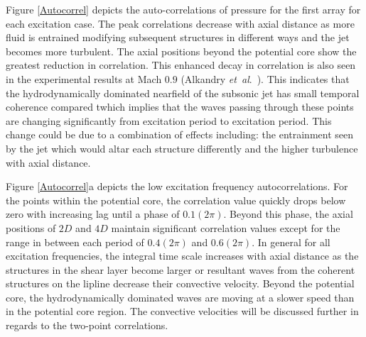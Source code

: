 \documentclass[english]{aiaa-tc}
\newcommand*{\etal}{\textit{et~al}.\ }
\begin{document}
Figure \ref{Autocorrel} depicts the auto-correlations of pressure for the first array for each excitation case. The peak correlations decrease with axial distance as more fluid is entrained modifying subsequent structures in different ways and the jet becomes more turbulent. The axial positions beyond the potential core show the greatest reduction in correlation. This enhanced decay in correlation is also seen in the experimental results at Mach $0.9$ (Alkandry \etal \cite{Alkandry2013}). This indicates that the hydrodynamically dominated nearfield of the subsonic jet has small temporal coherence compared twhich implies that the waves passing through these points are changing significantly from excitation period to excitation period. This change could be due to a combination of effects including: the entrainment seen by the jet which would altar each structure differently and the higher turbulence with axial distance.

Figure \ref{Autocorrel}a depicts the low excitation frequency autocorrelations. For the points within the potential core, the correlation value quickly drops below zero with increasing lag until a phase of $0.1(2\pi)$. Beyond this phase, the axial positions of $2D$ and $4D$ maintain significant correlation values except for the range in between each period of $0.4(2\pi)$ and $0.6(2\pi)$. In general for all excitation frequencies, the integral time scale increases with axial distance as the structures in the shear layer become larger  or resultant waves from the coherent structures on the lipline decrease their convective velocity. Beyond the potential core, the hydrodynamically dominated waves are moving at a slower speed than in the potential core region. The convective velocities will be discussed further in regards to the two-point correlations.
\end{document}
